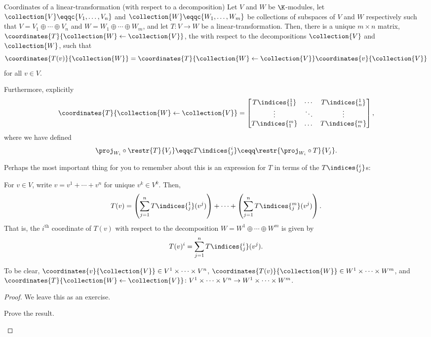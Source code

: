 \begin{thm}{Coordinates of a linear-transformation (with respect to a decomposition)}{}
	Let $V$ and $W$ be $\K$-modules, let $\collection{V}\eqqc \{V_1,\ldots ,V_n\}$ and $\collection{W}\eqqc \{ W_1,\ldots ,W_m\}$ be collections of subspaces of $V$ and $W$ respectively such that $V=V_1\oplus \cdots \oplus V_n$ and $W=W_1\oplus \cdots \oplus W_m$, and let $T\colon V\rightarrow W$ be a linear-transformation.  Then, there is a unique $m\times n$ matrix, $\coordinates{T}{\collection{W}\leftarrow \collection{V}}$, the  with respect to the decompositions $\collection{V}$ and $\collection{W}$, such that
	\begin{equation}
		\coordinates{T(v)}{\collection{W}}=\coordinates{T}{\collection{W}\leftarrow \collection{V}}\coordinates{v}{\collection{V}}
	\end{equation}
	for all $v\in V$.
	
	Furthermore, explicitly
	\begin{equation}
		\coordinates{T}{\collection{W}\leftarrow \collection{V}}=\begin{bmatrix}T\indices{^1_1} & \cdots & T\indices{^1_n} \\ \vdots & \ddots & \vdots \\ T\indices{^m_1} & \dots & T\indices{^m_n}\end{bmatrix},
	\end{equation}
	where we have defined
	\begin{equation}
		\proj _{W_i}\circ \restr{T}{V_j}\eqqc T\indices{^i_j}\ceqq \restr{\proj _{W_i}\circ T}{V_j}.
	\end{equation}
	\begin{rmk}
		Perhaps the most important thing for you to remember about this is an expression for $T$ in terms of the $T\indices{^i_j}$s:
		
		For $v\in V$, write $v=v^1+\cdots +v^n$ for unique $v^k\in V^k$.  Then,
		\begin{equation}
			T(v)=\left( \sum _{j=1}^nT\indices{^1_j}(v^j)\right) +\cdots +\left( \sum _{j=1}^nT\indices{^m_j}(v^j)\right) .
		\end{equation}
		That is, the $i^{\text{th}}$ coordinate of $T(v)$ with respect to the decomposition $W=W^1\oplus \cdots \oplus W^m$ is given by
		\begin{equation}
			T(v)^i=\sum _{j=1}^nT\indices{^i_j}(v^j).
		\end{equation}
	\end{rmk}
	\begin{rmk}
		To be clear, $\coordinates{v}{\collection{V}}\in V^1\times \cdots \times V^n$, $\coordinates{T(v)}{\collection{W}}\in W^1\times \cdots \times W^m$, and $\coordinates{T}{\collection{W}\leftarrow \collection{V}}\colon V^1\times \cdots \times V^n\rightarrow W^1\times \cdots \times W^m$.
	\end{rmk}
	\begin{proof}
		We leave this as an exercise.
		\begin{exr}[breakable=false]{}{}
			Prove the result.
		\end{exr}
	\end{proof}
\end{thm}
